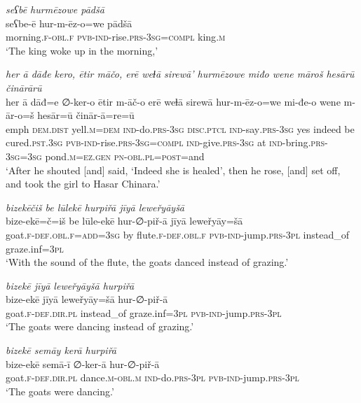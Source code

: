 \ea \label{ZP.37}
\textit{seʕbē hurmēzowe pādšā} \\ 
\gll seʕbe-ē hur-m-ēz-o=we pādšā \\ 
 morning\textsc{.f}\textsc{-obl}\textsc{.f} \textsc{pvb-}\textsc{ind-}rise\textsc{.prs}\textsc{-3sg}\textsc{=compl} king\textsc{.m} \\ 
\glt `The king woke up in the morning,'
\z 
 
\ea \label{ZP.61}
\textit{her ā dāđe kero, ētir māčo, erē weɫā sirewā’ hurmēzowe miđo wene māroš hesārū činārārū} \\ 
\gll her ā dāđ=e ∅-ker-o ētir m-āč-o erē weɫā sirewā hur-m-ēz-o=we mi-đe-o wene m-ār-o=š hesār=ū činār-ā=re=ū \\ 
 emph \textsc{dem.dist} yell\textsc{.m}\textsc{=dem} \textsc{ind-}do\textsc{.prs}\textsc{-3sg} \textsc{disc.ptcl} \textsc{ind-}say\textsc{.prs}\textsc{-3sg} yes indeed be cured\textsc{.pst}\textsc{.3sg} \textsc{pvb-}\textsc{ind-}rise\textsc{.prs}\textsc{-3sg}\textsc{=compl} \textsc{ind-}give\textsc{.prs}\textsc{-3sg} at \textsc{ind-}bring\textsc{.prs}\textsc{-3sg}\textsc{=3sg} pond\textsc{.m}\textsc{\textsc{=ez.gen}} \textsc{pn}\textsc{-obl}\textsc{.pl}\textsc{=\textsc{post}}=and \\ 
\glt `After he shouted [and] said, ‘Indeed she is healed’, then he rose, [and] set off, and took the girl to Hasar Chinara.'
\z 
 
\ea \label{ŽP.37}
\textit{bizekēčiš be lūlekē hurpiřā jīyā leweřyāyšā} \\ 
\gll bize-ekē=č=iš be lūle-ekē hur-∅-piř-ā jīyā leweřyāy=šā \\ 
 goat\textsc{.f}\textsc{-def}\textsc{.obl}\textsc{.f}\textsc{=add}\textsc{=3sg} by flute\textsc{.f}\textsc{-def}\textsc{.obl}\textsc{.f} \textsc{pvb-}\textsc{ind-}jump\textsc{.prs}\textsc{-3pl} instead\_of graze.inf\textsc{=3pl} \\ 
\glt `With the sound of the flute, the goats danced instead of grazing.'
\z 
 
\ea \label{ŽP.55}
\textit{bizekē jīyā leweřyāyšā hurpiřā} \\ 
\gll bize-ekē jīyā leweřyāy=šā hur-∅-piř-ā \\ 
 goat\textsc{.f}\textsc{-def}\textsc{.dir}\textsc{.pl} instead\_of graze.inf\textsc{=3pl} \textsc{pvb-}\textsc{ind-}jump\textsc{.prs}\textsc{-3pl} \\ 
\glt `The goats were dancing instead of grazing.'
\z 
 
\ea \label{ŽP.56}
\textit{bizekē semāy kerā hurpiřā} \\ 
\gll bize-ekē semā-ī ∅-ker-ā hur-∅-piř-ā \\ 
 goat\textsc{.f}\textsc{-def}\textsc{.dir}\textsc{.pl} dance\textsc{.m}\textsc{-obl}\textsc{.m} \textsc{ind-}do\textsc{.prs}\textsc{-3pl} \textsc{pvb-}\textsc{ind-}jump\textsc{.prs}\textsc{-3pl} \\ 
\glt `The goats were dancing.'
\z 
 
